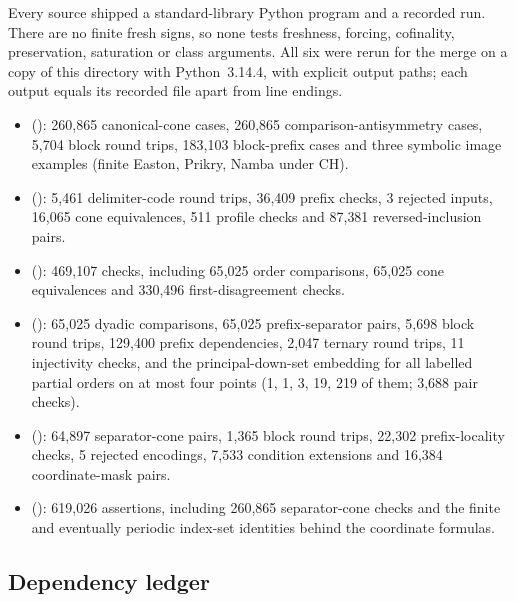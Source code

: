 \documentclass[11pt,letterpaper]{article}
\numberwithin{equation}{section}
\theoremstyle{definition}
\theoremstyle{remark}
\begin{document}
Every source shipped a standard-library Python program and a recorded run. There are no finite fresh
signs, so none tests freshness, forcing, cofinality, preservation, saturation or class arguments.
All six were rerun for the merge on a copy of this directory with Python~3.14.4, with explicit output
paths; each output equals its recorded file apart from line endings.
\begin{itemize}
\item {}
(): 260{,}865 canonical-cone cases,
260{,}865 comparison-antisymmetry cases, 5{,}704 block round trips, 183{,}103 block-prefix cases and
three symbolic image examples (finite Easton, Prikry, Namba under CH).
\item {}
(): 5{,}461 delimiter-code round trips,
36{,}409 prefix checks, 3 rejected inputs, 16{,}065 cone equivalences, 511 profile checks and 87{,}381
reversed-inclusion pairs.
\item {}
(): 469{,}107 checks, including 65{,}025 order
comparisons, 65{,}025 cone equivalences and 330{,}496 first-disagreement checks.
\item {}
(): 65{,}025 dyadic comparisons, 65{,}025
prefix-separator pairs, 5{,}698 block round trips, 129{,}400 prefix dependencies, 2{,}047 ternary
round trips, 11 injectivity checks, and the principal-down-set embedding for all labelled partial
orders on at most four points (1, 1, 3, 19, 219 of them; 3{,}688 pair checks).
\item {}
(): 64{,}897 separator-cone pairs,
1{,}365 block round trips, 22{,}302 prefix-locality checks, 5 rejected encodings, 7{,}533
condition extensions and 16{,}384 coordinate-mask pairs.
\item {}
(): 619{,}026 assertions, including 260{,}865
separator-cone checks and the finite and eventually periodic index-set identities behind the
coordinate formulas.
\end{itemize}

\subsection{Dependency ledger}
\end{document}
